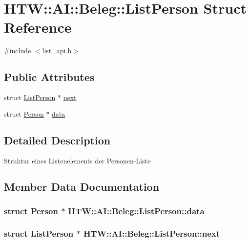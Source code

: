 \hypertarget{struct_h_t_w_1_1_a_i_1_1_beleg_1_1_list_person}{\section{H\-T\-W\-:\-:A\-I\-:\-:Beleg\-:\-:List\-Person Struct Reference}
\label{struct_h_t_w_1_1_a_i_1_1_beleg_1_1_list_person}
}


{\ttfamily \#include $<$list\-\_\-api.\-h$>$}

\subsection*{Public Attributes}
\begin{DoxyCompactItemize}
\item 
struct \hyperlink{struct_h_t_w_1_1_a_i_1_1_beleg_1_1_list_person}{List\-Person} $\ast$ \hyperlink{struct_h_t_w_1_1_a_i_1_1_beleg_1_1_list_person_a81dcd34a511cd1449407bee6ae6000ca}{next}
\item 
struct \hyperlink{struct_h_t_w_1_1_a_i_1_1_beleg_1_1_person}{Person} $\ast$ \hyperlink{struct_h_t_w_1_1_a_i_1_1_beleg_1_1_list_person_a81b63974078ee4c6013157d095fc6c01}{data}
\end{DoxyCompactItemize}


\subsection{Detailed Description}
Struktur eines Listenelements der Personen-\/\-Liste 

\subsection{Member Data Documentation}
\hypertarget{struct_h_t_w_1_1_a_i_1_1_beleg_1_1_list_person_a81b63974078ee4c6013157d095fc6c01}{
\subsubsection[{data}]{\setlength{\rightskip}{0pt plus 5cm}struct {\bf Person} $\ast$ H\-T\-W\-::\-A\-I\-::\-Beleg\-::\-List\-Person\-::data}}\label{struct_h_t_w_1_1_a_i_1_1_beleg_1_1_list_person_a81b63974078ee4c6013157d095fc6c01}
\hypertarget{struct_h_t_w_1_1_a_i_1_1_beleg_1_1_list_person_a81dcd34a511cd1449407bee6ae6000ca}{
\subsubsection[{next}]{\setlength{\rightskip}{0pt plus 5cm}struct {\bf List\-Person} $\ast$ H\-T\-W\-::\-A\-I\-::\-Beleg\-::\-List\-Person\-::next}}\label{struct_h_t_w_1_1_a_i_1_1_beleg_1_1_list_person_a81dcd34a511cd1449407bee6ae6000ca}


